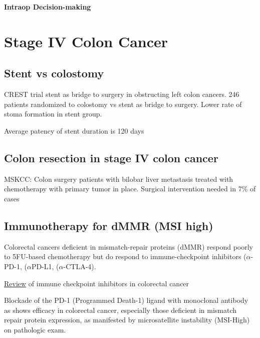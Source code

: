 \documentclass[
]{book}
\begin{document}
\textbf{Intraop Decision-making}

\hypertarget{stage-iv-colon-cancer}{%
\chapter{Stage IV Colon Cancer}\label{stage-iv-colon-cancer}}

\hypertarget{stent-vs-colostomy}{%
\section{Stent vs colostomy}\label{stent-vs-colostomy}}

CREST trial\citep{crestcollaborativegroup1073} stent as bridge to surgery in obstructing left colon cancers. 246 patients randomized to colostomy vs stent as bridge to surgery. Lower rate of stoma formation in stent group.

Average patency of stent duration is 120 days

\hypertarget{colon-resection-in-stage-iv-colon-cancer}{%
\section{Colon resection in stage IV colon cancer}\label{colon-resection-in-stage-iv-colon-cancer}}

MSKCC: Colon surgery patients with bilobar liver metastasis treated with chemotherapy with primary tumor in place. Surgical intervention needed in 7\% of cases \citep{poultsides35}

\hypertarget{immunotherapy-for-dmmr-msi-high}{%
\section{Immunotherapy for dMMR (MSI high)}\label{immunotherapy-for-dmmr-msi-high}}

Colorectal cancers deficient in mismatch-repair proteins (dMMR) respond poorly to 5FU-based chemotherapy but do respond to immune-checkpoint inhibitors (\(\alpha\)-PD-1, (\(\alpha\)PD-L1, (\(\alpha\)-CTLA-4).

\href{https://www.frontiersin.org/articles/10.3389/fimmu.2022.795972/full}{Review} of immune checkpoint inhibitors in colorectal cancer

Blockade of the PD-1 (Programmed Death-1) ligand with monoclonal antibody as shows efficacy in colorectal cancer, especially those deficient in mismatch repair protein expression, as manifested by microsatellite instability (MSI-High) on pathologic exam.
\end{document}
